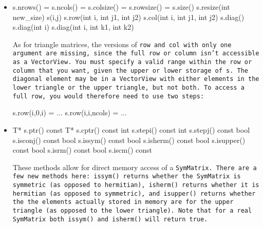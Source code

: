 \begin{itemize}

\item
\begin{tmvcode}
s.nrows() = s.ncols() = s.colsize() = s.rowsize() = s.size()
s.resize(int new_size)
s(i,j)
s.row(int i, int j1, int j2)
s.col(int i, int j1, int j2)
s.diag()
s.diag(int i)
s.diag(int i, int k1, int k2)
\end{tmvcode}
As for triangle matrices, the versions of \tt{row} and \tt{col} with only one argument are
missing, since the full row or column isn't accessible as a \tt{VectorView}.
You must specify a valid range within the row or column that you want, 
given the upper or lower storage of \tt{s}.
The diagonal element may be in a \tt{VectorView} with either elements in the 
lower triangle or the upper triangle, but not both.  To access a full row, you would 
therefore need to use two steps:
\begin{tmvcode}
s.row(i,0,i) = ...
s.row(i,i,ncols) = ...
\end{tmvcode}

\item
\begin{tmvcode}
T* s.ptr()
const T* s.cptr() const
int s.stepi() const
int s.stepj() const
bool s.isconj() const
bool s.issym() const
bool s.isherm() const
bool s.isupper() const
bool s.isrm() const
bool s.iscm() const
\end{tmvcode}
These methods allow for direct memory access of a \tt{SymMatrix}.  There are a few new methods here: \tt{issym()} returns whether the \tt{SymMatrix} is symmetric (as opposed to hermitian), \tt{isherm()} returns whether it is hermitian (as opposed to symmetric), and \tt{isupper()} returns whether the the elements actually stored in memory are for the upper triangle (as opposed to the lower triangle).  Note that for a real \tt{SymMatrix} both \tt{issym()} and \tt{isherm()} will return \tt{true}.


\end{itemize}
